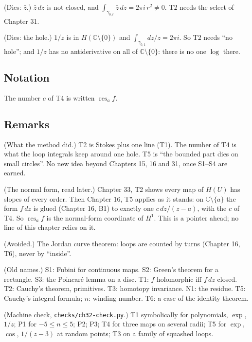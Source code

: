 \begin{lines}
\item[\lab{P2}] (Dies: $\bar z$.) $\bar z\,dz$ is not closed, and $\int_{\gamma_{0,r}} \bar z\,dz = 2\pi i\,r^2 \ne 0$. T2 needs the select of Chapter 31.
\item[\lab{P3}] (Dies: the hole.) $1/z$ is in $H(\mathbb{C} \setminus \{0\})$ and $\int_{\gamma_{0,1}} dz/z = 2\pi i$. So T2 needs ``no hole''; and $1/z$ has no antiderivative on all of $\mathbb{C} \setminus \{0\}$: there is no one $\log$ there.
\end{lines}

\subsection*{Notation}

\begin{lines}
\item[\lab{N1}] The number $c$ of T4 is written $\operatorname{res}_a f$.
\end{lines}

\subsection*{Remarks}

\begin{lines}
\item[\lab{R1}] (What the method did.) T2 is Stokes plus one line (T1). The number of T4 is what the loop integrals keep around one hole. T5 is ``the bounded part dies on small circles''. No new idea beyond Chapters 15, 16 and 31, once S1--S4 are earned.
\item[\lab{R2}] (The normal form, read later.) Chapter 33, T2 shows every map of $H(U)$ has slopes of every order. Then Chapter 16, T5 applies as it stands: on $\mathbb{C} \setminus \{a\}$ the form $f\,dz$ is glued (Chapter 16, B1) to exactly one $c\,dz/(z - a)$, with the $c$ of T4. So $\operatorname{res}_a f$ is the normal-form coordinate of $H^1$. This is a pointer ahead; no line of this chapter relies on it.
\item[\lab{R3}] (Avoided.) The Jordan curve theorem: loops are counted by turns (Chapter 16, T6), never by ``inside''.
\item[\lab{R4}] (Old names.) S1: Fubini for continuous maps. S2: Green's theorem for a rectangle. S3: the Poincar\'e lemma on a disc. T1: $f$ holomorphic iff $f\,dz$ closed. T2: Cauchy's theorem, primitives. T3: homotopy invariance. N1: the residue. T5: Cauchy's integral formula; $n$: winding number. T6: a case of the identity theorem.
\item[\lab{R5}] (Machine check, \texttt{checks/ch32-check.py}.) T1 symbolically for polynomials, $\exp$, $1/z$; P1 for $-5 \le n \le 5$; P2; P3; T4 for three maps on several radii; T5 for $\exp$, $\cos$, $1/(z - 3)$ at random points; T3 on a family of squashed loops.
\end{lines}

